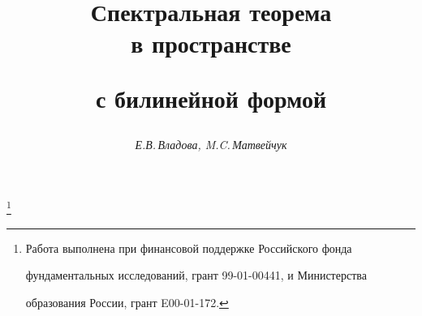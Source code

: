 









\renewcommand{\baselinestretch}{0.95}


\newcommand{\pr}{\operatorname{pr}}


\newcommand{\tts}[1]{}







\setcounter{page}{13}















\author{\it Е.В.\,Владова, M.C.\,Матвейчук}




\title{Спектральная теорема\\ в пространстве


с билинейной формой}


\thanks{Работа выполнена при финансовой поддержке Российского фонда


фундаментальных исследований, грант 99-01-00441, и Министерства


образования России, грант E00-01-172.}





\date{}




\pagestyle{plain} %





